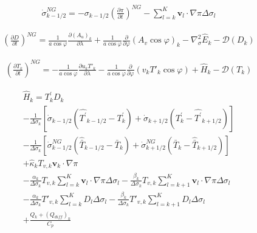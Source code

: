 \begin{eqnarray}
  \dot{\sigma}^{NG}_{k-1/2}
 = - \sigma_{k-1/2} \left( \frac{\partial \pi}{\partial t} \right)^{NG}
   - \sum_{l=k}^{K} \mathbf{v}_{l} \cdot \nabla \pi
       \Delta  \sigma_{l}
\end{eqnarray}

\begin{eqnarray}
  \left( \frac{\partial D}{\partial t} \right)^{NG}
       =   \frac{1}{a\cos\varphi}
            \frac{\partial (A_u)_{k}}{\partial \lambda}
          + \frac{1}{a\cos\varphi}
            \frac{\partial }{\partial \varphi} (A_v \cos\varphi)_k
          - \nabla^{2}_{\sigma} \hat{E}_{k}
          - {\mathcal D}(D_{k})
\end{eqnarray}

\begin{eqnarray}
  \left( \frac{\partial T_{k}}{\partial t} \right)^{NG}
      =   - \frac{1}{a\cos\varphi}
               \frac{\partial u_k T'_k}{\partial \lambda}
          - \frac{1}{a\cos\varphi}
               \frac{\partial }{\partial \varphi} (v_k T'_k \cos\varphi)
          + \hat{H}_{k}
          - {\mathcal D}(T_{k})
\end{eqnarray}

\begin{eqnarray}
 \hat{H}_k  =  T_{k}^{\prime} D_{k}  \\
         - \frac{1}{\Delta \sigma_{k}}
             [   \dot{\sigma}_{k-1/2} ( \hat{T^{\prime}}_{k-1/2}
                                         - T^{\prime}_{k}   )
               + \dot{\sigma}_{k+1/2} ( T^{\prime}_{k}  
                                         - \hat{T^{\prime}}_{k+1/2} ) ]
                \\
         - \frac{1}{\Delta \sigma_{k}}
             [   \dot{\sigma}^{NG}_{k-1/2} ( \hat{\bar{T}}_{k-1/2}
                                         - \bar{T}_{k}   )
               + \dot{\sigma}^{NG}_{k+1/2} ( \bar{T}_{k}  
                                         - \hat{\bar{T}}_{k+1/2} ) ]
                \\
         + \hat{\kappa}_{k} T_{v,k} \mathbf{v}_{k} \cdot \nabla \pi
                \\
         - \frac{\alpha_{k}}{\Delta \sigma_{k} } T_{v,k}
             \sum_{l=k}^{K} \mathbf{v}_{l} \cdot \nabla \pi
               \Delta \sigma_{l}
           - \frac{\beta_{k}}{\Delta \sigma_{k} } T_{v,k}
             \sum_{l=k+1}^{K} \mathbf{v}_{l} \cdot \nabla \pi
               \Delta \sigma_{l}
                \\
         - \frac{\alpha_{k}}{\Delta \sigma_{k} } T'_{v,k}
             \sum_{l=k}^{K} D_l  \Delta \sigma_{l}
           - \frac{\beta_{k}}{\Delta \sigma_{k} } T'_{v,k}
             \sum_{l=k+1}^{K} D_l  \Delta \sigma_{l}
                \\
         + \frac{Q_k + (Q_{diff})_k}{C_p}
\end{eqnarray}

